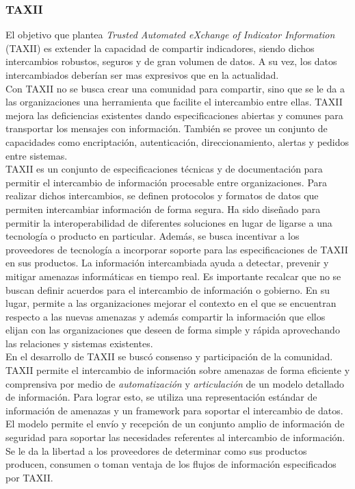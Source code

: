 \subsubsection{TAXII}

El objetivo que plantea \textit{Trusted Automated eXchange of Indicator Information} (TAXII) es extender la capacidad de compartir indicadores, 
siendo dichos intercambios robustos, seguros y de gran volumen de datos. A su 
vez, los datos intercambiados deberían ser mas expresivos que en la actualidad.\\

Con TAXII no se busca crear una comunidad para compartir, sino que se le da a 
las organizaciones una herramienta que facilite el intercambio entre ellas. 
TAXII mejora las deficiencias existentes dando especificaciones abiertas y 
comunes para transportar los mensajes con información. También se provee un 
conjunto de capacidades como encriptación, autenticación, direccionamiento, 
alertas y pedidos entre sistemas.\\

TAXII es un conjunto de especificaciones técnicas y de documentación para 
permitir el intercambio de información procesable entre organizaciones. Para 
realizar dichos intercambios, se definen protocolos y formatos de datos que 
permiten intercambiar información de forma segura. Ha sido diseñado para permitir la
interoperabilidad de diferentes soluciones en lugar de ligarse a una tecnología o producto en particular.
Además, se busca incentivar a los proveedores de tecnología a incorporar soporte para las especificaciones
de TAXII en sus productos. La información intercambiada 
ayuda a detectar, prevenir y mitigar amenazas informáticas en tiempo real. Es 
importante recalcar que no se buscan definir acuerdos para el intercambio de 
información o gobierno. En su lugar, permite a las organizaciones mejorar el 
contexto en el que se encuentran respecto a las nuevas amenazas y además 
compartir la información que ellos elijan con las organizaciones que deseen de 
forma simple y rápida aprovechando las relaciones y sistemas existentes.\\

En el desarrollo de TAXII se buscó consenso y participación de la comunidad. 
TAXII permite el intercambio de información sobre amenazas de forma eficiente y 
comprensiva por medio de \emph{automatización} y \emph{articulación} de un 
modelo detallado de información. Para lograr esto, se utiliza una representación 
estándar de información de amenazas y un framework para soportar el intercambio 
de datos. El modelo permite el envío y recepción de un conjunto amplio de 
información de seguridad para soportar las necesidades referentes al intercambio 
de información. Se le da la libertad a los proveedores de determinar como sus 
productos producen, consumen o toman ventaja de los flujos de información 
especificados por TAXII.\\

